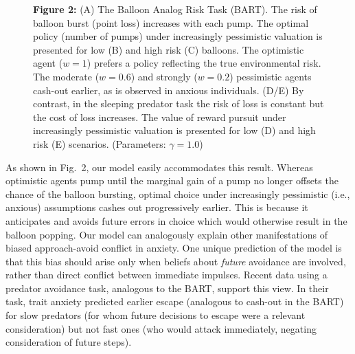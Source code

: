 \documentclass[11pt]{article} %
\begin{document}
\begin{figure}
  \centerline{%
  }
  \par \textbf{Figure 2:} (A) The Balloon Analog Risk Task (BART). The risk of balloon burst (point loss) increases with each pump. The optimal policy (number of pumps) under increasingly pessimistic valuation is presented for low (B) and high risk (C) balloons. The optimistic agent ($w=1$) prefers a policy reflecting the true environmental risk. The moderate ($w=0.6$) and strongly ($w=0.2$) pessimistic agents cash-out earlier, as is observed in anxious individuals. (D/E) By contrast, in the sleeping predator task the risk of loss is constant but the cost of loss increases. The value of reward pursuit under increasingly pessimistic valuation is presented for low (D) and high risk (E) scenarios. (Parameters: $\gamma = 1.0$)
\end{figure}

As shown in Fig.~2, our model easily accommodates this result. Whereas optimistic agents pump until the marginal gain of a pump no longer offsets the chance of the balloon bursting, optimal choice under increasingly pessimistic (i.e., anxious) assumptions cashes out progressively earlier. This is because it anticipates and avoids future errors in choice which would otherwise result in the balloon popping. Our model can analogously explain other manifestations of biased approach-avoid conflict in anxiety\cite{Mobbs2019}. One unique prediction of the model is that this bias should arise only when beliefs about \emph{future} avoidance are involved, rather than direct conflict between immediate impulses. Recent data \cite{Mobbs2019} using a predator avoidance task, analogous to the BART, support this view. In their task, trait anxiety predicted earlier escape (analogous to cash-out in the BART) for slow predators (for whom future decisions to escape were a relevant consideration) but not fast ones (who would attack immediately, negating consideration of future steps). 
\end{document}
